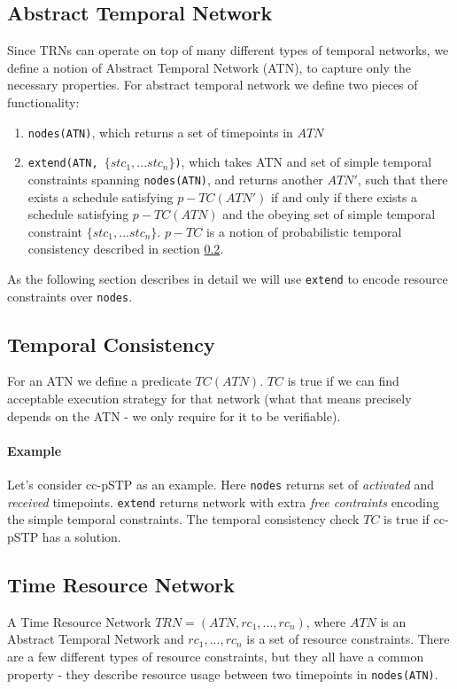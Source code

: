 \documentclass{article}
\begin{document}
\begin{multicols}{2}
\subsection{Abstract Temporal Network}
Since TRNs can operate on top of many different types of temporal networks, we define a notion of Abstract Temporal Network (ATN), to capture only the necessary properties. For abstract temporal network we define two pieces of functionality:
\begin{enumerate}
\item \texttt{nodes(ATN)}, which returns a set of timepoints in $ATN$
\item \texttt{extend(ATN, $\{ stc_1, ... stc_n \} $)}, which takes ATN and set of simple temporal constraints \cite{cervoni1993maintaining} spanning \texttt{nodes(ATN)}, and returns another $ATN'$, such that there exists a schedule satisfying $p-TC(ATN')$ if and only if there exists a schedule satisfying $p-TC(ATN)$ and the obeying set of simple temporal constraint $\{ stc_1, ... stc_n \} $. $p-TC$ is a notion of probabilistic temporal consistency described in section \ref{temporal_consistency}.
\end{enumerate}
As the following section describes in detail we will use \texttt{extend} to encode resource constraints over \texttt{nodes}.
\subsection{Temporal Consistency}
\label{temporal_consistency}
For an ATN we define a predicate $TC(ATN)$. $TC$ is true if we can find acceptable execution strategy for that network (what that means precisely depends on the ATN - we only require for it to be verifiable).
\paragraph{Example} Let's consider cc-pSTP \cite{Fang2014} as an example. Here \texttt{nodes} returns set of \textit{activated} and \textit{received} timepoints. \texttt{extend} returns network with extra \textit{free contraints} encoding the simple temporal constraints. The temporal consistency check $TC$ is true if cc-pSTP has a solution.
\subsection{Time Resource Network}
A Time Resource Network $TRN = (ATN, {rc_1, ..., rc_n})$, where $ATN$ is an Abstract Temporal Network and ${rc_1, ..., rc_n}$ is a set of resource constraints. There are a few different types of resource constraints, but they all have a common property - they describe resource usage between two timepoints in \texttt{nodes(ATN)}.

\end{multicols}
\end{document}
